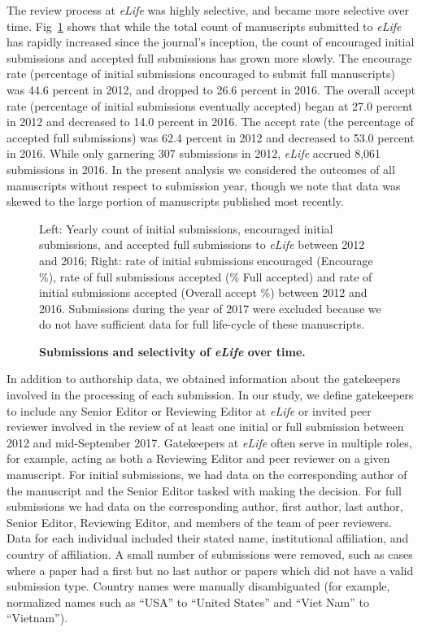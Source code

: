 \documentclass[10pt,letterpaper]{article}
\begin{document}
The review process at \textit{eLife} was highly selective, and became more selective over time. Fig~\ref{fig2} shows that while the total count of manuscripts submitted to \textit{eLife} has rapidly increased since the journal’s inception, the count of encouraged initial submissions and accepted full submissions has grown more slowly. The encourage rate (percentage of initial submissions encouraged to submit full manuscripts) was 44.6 percent in 2012, and dropped to 26.6 percent in 2016. The overall accept rate (percentage of initial submissions eventually accepted) began at 27.0 percent in 2012 and decreased to 14.0 percent in 2016. The accept rate (the percentage of accepted full submissions) was 62.4 percent in 2012 and decreased to 53.0 percent in 2016. While only garnering 307 submissions in 2012, \textit{eLife} accrued 8,061 submissions in 2016. In the present analysis we considered the outcomes of all manuscripts without respect to submission year, though we note that data was skewed to the large portion of manuscripts published most recently. 

\begin{figure}[!h]
\caption{\bf Submissions and selectivity of \textit{eLife} over time.}
Left: Yearly count of initial submissions, encouraged initial submissions, and accepted full submissions to \textit{eLife} between 2012 and 2016; Right: rate of initial submissions encouraged (Encourage \%), rate of full submissions accepted (\% Full accepted) and rate of initial submissions accepted (Overall accept \%) between 2012 and 2016. Submissions during the year of 2017 were excluded because we do not have sufficient data for full life-cycle of these manuscripts. 
\label{fig2}
\end{figure}

In addition to authorship data, we obtained information about the gatekeepers involved in the processing of each submission. In our study, we define gatekeepers to include any Senior Editor or Reviewing Editor at \textit{eLife} or invited peer reviewer involved in the review of at least one initial or full submission between 2012 and mid-September 2017. Gatekeepers at \textit{eLife} often serve in multiple roles, for example, acting as both a Reviewing Editor and peer reviewer on a given manuscript. For initial submissions, we had data on the corresponding author of the manuscript and the Senior Editor tasked with making the decision. For full submissions we had data on the corresponding author, first author, last author, Senior Editor, Reviewing Editor, and members of the team of peer reviewers. Data for each individual included their stated name, institutional affiliation, and country of affiliation. A small number of submissions were removed, such as cases where a paper had a first but no last author or papers which did not have a valid submission type. Country names were manually disambiguated (for example, normalized names such as “USA” to “United States” and “Viet Nam” to “Vietnam”). 
\end{document}

